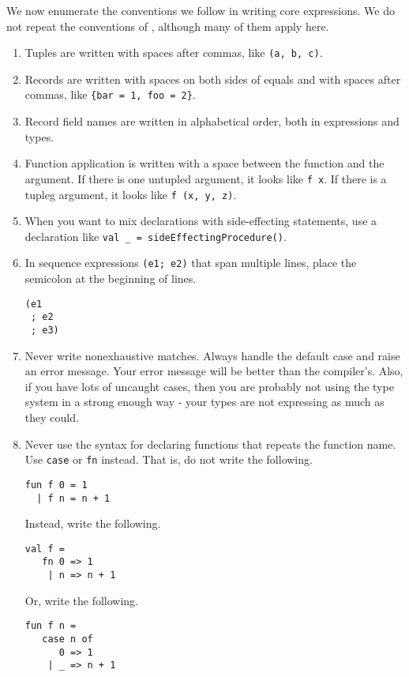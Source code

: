 \documentclass[12pt]{article}
\begin{document}
We now enumerate the conventions we follow in writing core expressions.  We do
not repeat the conventions of , although many of them apply
here.
\begin{enumerate}

\item
Tuples are written with spaces after commas, like {\tt (a, b, c)}.

\item
Records are written with spaces on both sides of equals and with spaces after
commas, like {\tt \{bar = 1, foo = 2\}}.

\item
Record field names are written in alphabetical order, both in expressions and
types.

\item
Function application is written with a space between the function and the
argument.  If there is one untupled argument, it looks like {\tt f x}.  If there
is a tupleg argument, it looks like {\tt f (x, y, z)}.

\item
When you want to mix declarations with side-effecting statements, use a
declaration like {\tt val \_ = sideEffectingProcedure()}.

\item
In sequence expressions {\tt (e1; e2)} that span multiple lines, place the
semicolon at the beginning of lines.
\begin{verbatim}
(e1
 ; e2
 ; e3)
\end{verbatim}

\item
Never write nonexhaustive matches.  Always handle the default case and raise an
error message.  Your error message will be better than the compiler's.  Also, if
you have lots of uncaught cases, then you are probably not using the type system
in a strong enough way - your types are not expressing as much as they could.

\item
Never use the syntax for declaring functions that repeats the function name.
Use {\tt case} or {\tt fn} instead.  That is, do not write the following.
\begin{verbatim}
fun f 0 = 1
  | f n = n + 1
\end{verbatim}
Instead, write the following.
\begin{verbatim}
val f =
   fn 0 => 1
    | n => n + 1
\end{verbatim}
Or, write the following.
\begin{verbatim}
fun f n =
   case n of
      0 => 1
    | _ => n + 1
\end{verbatim}

\end{enumerate}



\end{document}
